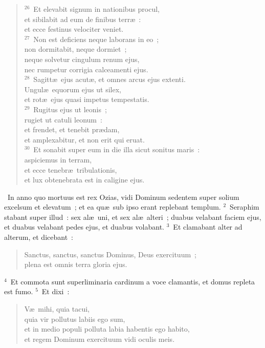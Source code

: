 \begin{flushleft}
\begin{verse}
${}^{26}$~Et elevabit signum in nationibus procul,\\ et sibilabit ad eum de finibus terr\ae~:\\ et ecce festinus velociter veniet.\\
${}^{27}$~Non est deficiens neque laborans in eo~;\\ non dormitabit, neque dormiet~;\\ neque solvetur cingulum renum ejus,\\ nec rumpetur corrigia calceamenti ejus.\\
${}^{28}$~Sagitt\ae\ ejus acut\ae , et omnes arcus ejus extenti.\\ Ungul\ae\ equorum ejus ut silex,\\ et rot\ae\ ejus quasi impetus tempestatis.\\
${}^{29}$~Rugitus ejus ut leonis~;\\ rugiet ut catuli leonum~:\\ et frendet, et tenebit pr\ae dam,\\ et amplexabitur, et non erit qui eruat.\\
${}^{30}$~Et sonabit super eum in die illa sicut sonitus maris~:\\ aspiciemus in terram,\\ et ecce tenebr\ae\ tribulationis,\\ et lux obtenebrata est in caligine ejus.\end{verse}\end{flushleft}


~\lettrine[lines=10,image=true,loversize=0.05,lraise=-0.03]{I}{}n anno quo mortuus est rex Ozias, vidi Dominum sedentem super solium excelsum et elevatum~; et ea qu\ae\ sub ipso erant replebant templum.
${}^{2}$~Seraphim stabant super illud~: sex al\ae\ uni, et sex al\ae\ alteri~; duabus velabant faciem ejus, et duabus velabant pedes ejus, et duabus volabant.
${}^{3}$~Et clamabant alter ad alterum, et dicebant~: \begin{flushleft}\begin{verse}Sanctus, sanctus, sanctus Dominus, Deus exercituum~;\\ plena est omnis terra gloria ejus.\end{verse}\end{flushleft}


${}^{4}$~Et commota sunt superliminaria cardinum a voce clamantis, et domus repleta est fumo.
${}^{5}$~Et dixi~: \begin{flushleft}\begin{verse}V\ae\ mihi, quia tacui,\\ quia vir pollutus labiis ego sum,\\ et in medio populi polluta labia habentis ego habito,\\ et regem Dominum exercituum vidi oculis meis.\end{verse}\end{flushleft}


